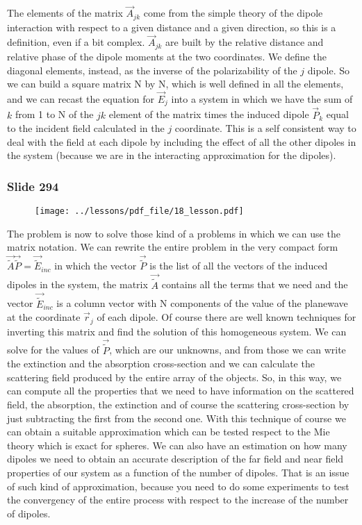 \documentclass[../main/main.tex]{subfiles}
\begin{document}
 The elements of the matrix $\vec{A}_{jk}$ come from the simple theory of the dipole interaction with respect to a given distance and a given direction, so this is a definition, even if a bit complex. $\vec{A}_{jk}$ are built by the relative distance and relative phase of the dipole moments at the two coordinates.
We define the diagonal elements, instead, as the inverse of the polarizability of the $j$ dipole.
So we can build a square matrix N by N, which is well defined in all the elements, and we can recast the equation for $\vec{E}_{j}$ into a system in which we have the sum of $k$ from 1 to N of the $jk$ element of the matrix times the induced dipole $\vec{P}_{k}$ equal to the incident field calculated in the $j$ coordinate.
This is a self consistent way to deal with the field at each dipole by including the effect of all the other dipoles in the system (because we are in the interacting approximation for the dipoles).

\newpage

\subsubsection{Slide 294}

\begin{figure}[h!]
\centering
\texttt{[image: ../lessons/pdf\_file/18\_lesson.pdf]}
\end{figure}

The problem is now to solve those kind of a problems in which we can use the matrix notation.
We can rewrite the entire problem in the very compact form $\vec{ \widetilde{A}} \vec{ \widetilde{P}} = \vec{ \widetilde{E}}_{inc}$ in which the vector $\vec{ \widetilde{P}}$ is the list of all the vectors of the induced dipoles in the system, the matrix $\vec{ \widetilde{A}}$ contains all the terms that we need and the vector $\vec{ \widetilde{E}}_{inc}$ is a column vector with N components of the value of the planewave at the coordinate $\vec{r}_j$ of each dipole.
Of course there are well known techniques for inverting this matrix and find the solution of this homogeneous system.
We can solve for the values of $\vec{ \widetilde{P}}$, which are our unknowns, and from those we can write the extinction and the absorption cross-section and we can calculate the scattering field produced by the entire array of the objects.
So, in this way, we can compute all the properties that we need to have information on the scattered field, the absorption, the extinction and of course the scattering cross-section by just subtracting the first from the second one.
With this technique of course we can obtain a suitable approximation which can be tested respect to the Mie theory which is exact for spheres. We can also have an estimation on how many dipoles we need to obtain an accurate description of the far field and near field properties of our system as a function of the number of dipoles.
 That is an issue of such kind of approximation, because you need to do some experiments to test the convergency of the entire process with respect to the increase of the number of dipoles.
\end{document}
